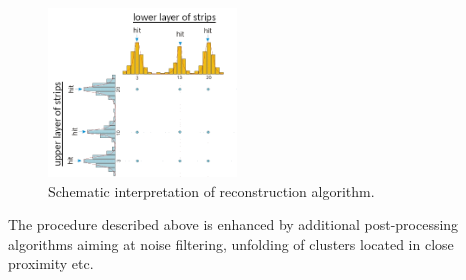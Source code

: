 \documentclass{webofc}
\begin{document}
\begin{figure}[h]
  \centering
  \includegraphics[width=5cm,clip]{fig2.png}
  \caption{Schematic interpretation of reconstruction algorithm.}
  \label{recoHits}
\end{figure}
The procedure described above is enhanced by additional post-processing algorithms aiming at noise filtering, unfolding of clusters located in close proximity etc.
\end{document}
